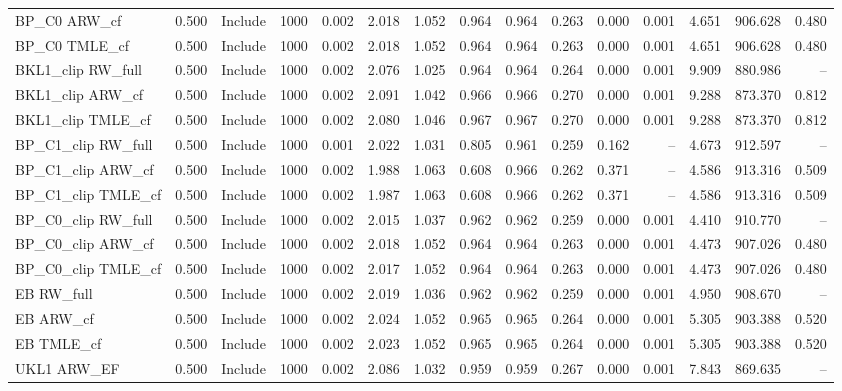\begin{tabular}{llllrrrrrrrrrrr}
BP\_C0 ARW\_cf & 0.500 & Include & 1000 & 0.002 & 2.018 & 1.052 & 0.964 & 0.964 & 0.263 & 0.000 & 0.001 & 4.651 & 906.628 & 0.480 \\
BP\_C0 TMLE\_cf & 0.500 & Include & 1000 & 0.002 & 2.018 & 1.052 & 0.964 & 0.964 & 0.263 & 0.000 & 0.001 & 4.651 & 906.628 & 0.480 \\
BKL1\_clip RW\_full & 0.500 & Include & 1000 & 0.002 & 2.076 & 1.025 & 0.964 & 0.964 & 0.264 & 0.000 & 0.001 & 9.909 & 880.986 & -- \\
BKL1\_clip ARW\_cf & 0.500 & Include & 1000 & 0.002 & 2.091 & 1.042 & 0.966 & 0.966 & 0.270 & 0.000 & 0.001 & 9.288 & 873.370 & 0.812 \\
BKL1\_clip TMLE\_cf & 0.500 & Include & 1000 & 0.002 & 2.080 & 1.046 & 0.967 & 0.967 & 0.270 & 0.000 & 0.001 & 9.288 & 873.370 & 0.812 \\
BP\_C1\_clip RW\_full & 0.500 & Include & 1000 & 0.001 & 2.022 & 1.031 & 0.805 & 0.961 & 0.259 & 0.162 & -- & 4.673 & 912.597 & -- \\
BP\_C1\_clip ARW\_cf & 0.500 & Include & 1000 & 0.002 & 1.988 & 1.063 & 0.608 & 0.966 & 0.262 & 0.371 & -- & 4.586 & 913.316 & 0.509 \\
BP\_C1\_clip TMLE\_cf & 0.500 & Include & 1000 & 0.002 & 1.987 & 1.063 & 0.608 & 0.966 & 0.262 & 0.371 & -- & 4.586 & 913.316 & 0.509 \\
BP\_C0\_clip RW\_full & 0.500 & Include & 1000 & 0.002 & 2.015 & 1.037 & 0.962 & 0.962 & 0.259 & 0.000 & 0.001 & 4.410 & 910.770 & -- \\
BP\_C0\_clip ARW\_cf & 0.500 & Include & 1000 & 0.002 & 2.018 & 1.052 & 0.964 & 0.964 & 0.263 & 0.000 & 0.001 & 4.473 & 907.026 & 0.480 \\
BP\_C0\_clip TMLE\_cf & 0.500 & Include & 1000 & 0.002 & 2.017 & 1.052 & 0.964 & 0.964 & 0.263 & 0.000 & 0.001 & 4.473 & 907.026 & 0.480 \\
EB RW\_full & 0.500 & Include & 1000 & 0.002 & 2.019 & 1.036 & 0.962 & 0.962 & 0.259 & 0.000 & 0.001 & 4.950 & 908.670 & -- \\
EB ARW\_cf & 0.500 & Include & 1000 & 0.002 & 2.024 & 1.052 & 0.965 & 0.965 & 0.264 & 0.000 & 0.001 & 5.305 & 903.388 & 0.520 \\
EB TMLE\_cf & 0.500 & Include & 1000 & 0.002 & 2.023 & 1.052 & 0.965 & 0.965 & 0.264 & 0.000 & 0.001 & 5.305 & 903.388 & 0.520 \\
UKL1 ARW\_EF & 0.500 & Include & 1000 & 0.002 & 2.086 & 1.032 & 0.959 & 0.959 & 0.267 & 0.000 & 0.001 & 7.843 & 869.635 & -- \\

\end{tabular}
